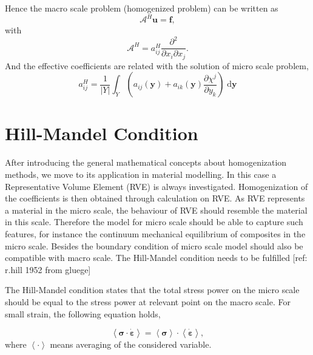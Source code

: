 \documentclass[10pt,a4paper]{scrreprt}
\newcommand{\myd}{\;\mathrm{d}}
\begin{document}
Hence the macro scale problem (homogenized problem) can be written as
\begin{equation}
\mathcal{A}^{H} \mathbf{u} = \mathbf{f},
\end{equation}
with
\begin{equation}
\mathcal{A}^{H} = a^{H}_{ij} \dfrac{\partial^{2}}{\partial x_{i} \partial x_{j}}.
\end{equation}
%
And the effective coefficients are related with the solution of micro scale problem,
\begin{equation}
a^{H}_{ij} = \dfrac{1}{|Y|} \int_{Y} \left( a_{ij}(\mathbf{y}) + a_{ik}(\mathbf{y}) \dfrac{\partial \chi^{j}}{\partial y_{k}} \right) \myd{\mathbf{y}}
\end{equation}

\section{Hill-Mandel Condition}
After introducing the general mathematical concepts about homogenization methods, we move to its application in material modelling. In this case a Representative Volume Element (RVE) is always investigated. Homogenization of the coefficients is then obtained through calculation on RVE. As RVE represents a material in the micro scale, the behaviour of RVE should resemble the material in this scale. Therefore the model for micro scale should be able to capture such features, for instance the continuum mechanical equilibrium of composites in the micro scale. Besides the boundary condition of micro scale model should also be compatible with macro scale. The Hill-Mandel condition needs to be fulfilled [ref: r.hill 1952 from gluege]

The Hill-Mandel condition states that the total stress power on the micro scale should be equal to the stress power at relevant point on the macro scale. For small strain, the following equation holds,

\begin{equation}
\left< \bm{\sigma} \cdot \dot{\bm{\varepsilon}} \right> = \left< \bm{\sigma} \right> \cdot \left< \dot{\bm{\varepsilon}} \right>,
\end{equation}
where $\left< \cdot \right>$ means averaging of the considered variable.
\end{document}
